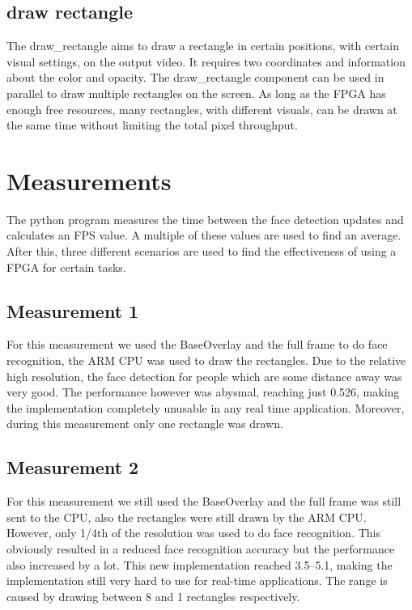 \documentclass[conference]{IEEEtran}
\begin{document}
\subsection{draw rectangle}
The draw\_rectangle aims to draw a rectangle in certain positions, with certain visual settings, on the output video. It requires two coordinates and information about the color and opacity. The draw\_rectangle component can be used in parallel to draw multiple rectangles on the screen. As long as the FPGA has enough free resources, many rectangles, with different visuals, can be drawn at the same time without limiting the total pixel throughput.

\section{Measurements}
The python program measures the time between the face detection updates and calculates an FPS value. A multiple of these values are used to find an average. After this, three different scenarios are used to find the effectiveness of using a FPGA for certain tasks.

\subsection{Measurement 1}
For this measurement we used the BaseOverlay and the full frame to do face recognition, the ARM CPU was used to draw the rectangles. Due to the relative high resolution, the face detection for people which are some distance away was very good.
The performance however was abysmal, reaching just \SI{0.526}{\fps}, making the implementation completely unusable in any real time application. Moreover, during this measurement only one rectangle was drawn.

\subsection{Measurement 2}
For this measurement we still used the BaseOverlay and the full frame was still sent to the CPU, also the rectangles were still drawn by the ARM CPU. However, only 1/4th of the resolution was used to do face recognition. This obviously resulted in a reduced face recognition accuracy but the performance also increased by a lot. This new implementation reached \SIrange{3.5}{5.1}{\fps}, making the implementation still very hard to use for real-time applications. The range is caused by drawing between 8 and 1 rectangles respectively.
\end{document}
